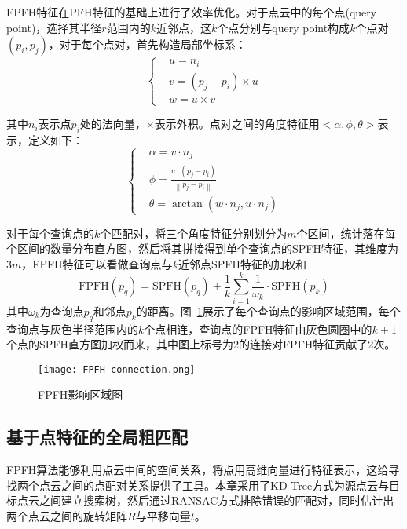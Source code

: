 FPFH特征在PFH特征\cite{rusu2008aligning}的基础上进行了效率优化。对于点云中的每个点(query point)，选择其半径$r$范围内的$k$近邻点，这$k$个点分别与query point构成$k$个点对$(p_i,p_j)$，对于每个点对，首先构造局部坐标系：
\begin{equation}
	\left\{
	\begin{aligned}
		& u = n_i \\
		& v = (p_j-p_i) \times u \\
		& w = u \times v
	\end{aligned}
	\right.
\end{equation}

其中$n_i$表示点$p_i$处的法向量，$\times$表示外积。点对之间的角度特征用$<\alpha, \phi, \theta>$表示，定义如下：
\begin{equation}
	\left\{
	\begin{aligned}
		& \alpha = v \cdot n_j \\
		& \phi = \frac{u\cdot (p_j-p_i)}{\left\|p_j-p_i\right\|} \\
		& \theta = \arctan(w\cdot n_j, u\cdot n_j)
	\end{aligned}	
	\right.
\end{equation}


对于每个查询点的$k$个匹配对，将三个角度特征分别划分为$m$个区间，统计落在每个区间的数量分布直方图，然后将其拼接得到单个查询点的SPFH特征，其维度为$3m$，FPFH特征可以看做查询点与$k$近邻点SPFH特征的加权和
\begin{equation}
	\text{FPFH}(p_q)=\text{SPFH}(p_q)+\frac{1}{k}\sum_{i=1}^k \frac{1}{\omega_k} \cdot \text{SPFH}(p_k)
\end{equation}
其中$\omega_k$为查询点$p_q$和邻点$p_k$的距离。图~\ref{FPFH-connection}展示了每个查询点的影响区域范围，每个查询点与灰色半径范围内的$k$个点相连，查询点的FPFH特征由灰色圆圈中的$k+1$个点的SPFH直方图加权而来，其中图上标号为2的连接对FPFH特征贡献了2次。
\begin{figure}
	\centering
	\texttt{[image: FPFH-connection.png]}
	\caption{FPFH影响区域图}
	\label{FPFH-connection}
\end{figure}

\subsection{基于点特征的全局粗匹配}
FPFH算法能够利用点云中间的空间关系，将点用高维向量进行特征表示，这给寻找两个点云之间的点配对关系提供了工具。本章采用了KD-Tree\cite{nuchter2007cached}方式为源点云与目标点云之间建立搜索树，然后通过RANSAC方式\cite{fischler1981random}排除错误的匹配对，同时估计出两个点云之间的旋转矩阵$R$与平移向量$t$。

